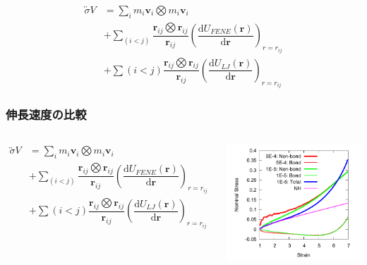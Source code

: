 \documentclass[11pt, dvipdfmx]{beamer}
\newcommand{\diff}{\mathrm d}
\begin{document}
\begin{appendix}
\begin{frame}
\begin{align*}
\overleftrightarrow{\sigma} V
&=\sum_i m_i \bm{v}_i \bigotimes m_i \bm{v}_i \\
&+\sum_{(i<j)} \dfrac{\bm{r}_{ij} \bigotimes \bm{r}_{ij}}{\bm{r}_{ij}}
\left( \dfrac{\diff U_{FENE}(\bm{r})}{\diff \bm{r}} \right)_{r=r_{ij}} \\
&+\sum{(i<j)} \dfrac{\bm{r}_{ij} \bigotimes \bm{r}_{ij}}{\bm{r}_{ij}}
\left( \dfrac{\diff U_{LJ}(\bm{r})}{\diff \bm{r}} \right)_{r=r_{ij}}
\end{align*}

\end{frame}



\begin{frame}
\frametitle{伸長速度の比較}

\begin{columns}[totalwidth=1\textwidth]
\tiny
\begin{align*}
\overleftrightarrow{\sigma} V
&=\sum_i m_i \bm{v}_i \bigotimes m_i \bm{v}_i \\
&+\sum_{(i<j)} \dfrac{\bm{r}_{ij} \bigotimes \bm{r}_{ij}}{\bm{r}_{ij}}
\left( \dfrac{\diff U_{FENE}(\bm{r})}{\diff \bm{r}} \right)_{r=r_{ij}} \\
&+\sum{(i<j)} \dfrac{\bm{r}_{ij} \bigotimes \bm{r}_{ij}}{\bm{r}_{ij}}
\left( \dfrac{\diff U_{LJ}(\bm{r})}{\diff \bm{r}} \right)_{r=r_{ij}}
\end{align*}

\includegraphics[width=\columnwidth]{./fig/SS_bond.pdf}
\end{columns}


\end{frame}
\end{appendix}
\end{document}

